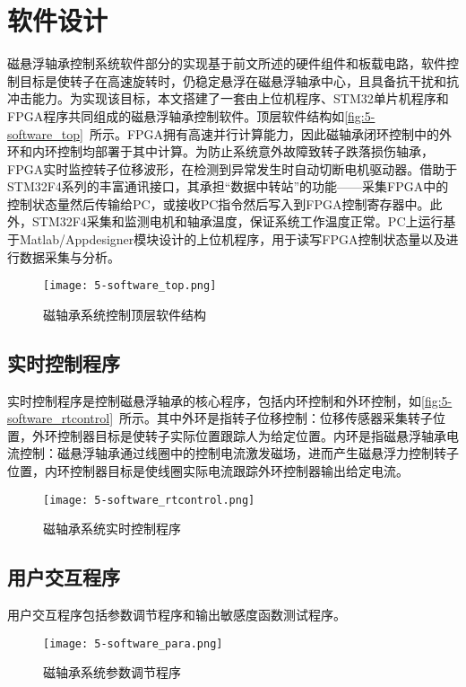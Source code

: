 \documentclass[
  lang=cn,
  degree=master,
  openany,oneside
]{nuaathesis}
\begin{document}
\section{软件设计}
磁悬浮轴承控制系统软件部分的实现基于前文所述的硬件组件和板载电路，软件控制目标是使转子在高速旋转时，仍稳定悬浮在磁悬浮轴承中心，且具备抗干扰和抗冲击能力。为实现该目标，本文搭建了一套由上位机程序、STM32单片机程序和FPGA程序共同组成的磁悬浮轴承控制软件。顶层软件结构如\autoref{fig:5-software_top}~所示。FPGA拥有高速并行计算能力，因此磁轴承闭环控制中的外环和内环控制均部署于其中计算。为防止系统意外故障致转子跌落损伤轴承，FPGA实时监控转子位移波形，在检测到异常发生时自动切断电机驱动器。借助于STM32F4系列的丰富通讯接口，其承担“数据中转站”的功能——采集FPGA中的控制状态量然后传输给PC，或接收PC指令然后写入到FPGA控制寄存器中。此外，STM32F4采集和监测电机和轴承温度，保证系统工作温度正常。PC上运行基于Matlab/Appdesigner模块设计的上位机程序，用于读写FPGA控制状态量以及进行数据采集与分析。

\begin{figure}[h!]
	\texttt{[image: 5-software\_top.png]}
	\caption{磁轴承系统控制顶层软件结构}
	\label{fig:5-software_top}
\end{figure}

\subsection{实时控制程序}
实时控制程序是控制磁悬浮轴承的核心程序，包括内环控制和外环控制，如\autoref{fig:5-software_rtcontrol}~所示。其中外环是指转子位移控制：位移传感器采集转子位置，外环控制器目标是使转子实际位置跟踪人为给定位置。内环是指磁悬浮轴承电流控制：磁悬浮轴承通过线圈中的控制电流激发磁场，进而产生磁悬浮力控制转子位置，内环控制器目标是使线圈实际电流跟踪外环控制器输出给定电流。

\begin{figure}[h!]
	\texttt{[image: 5-software\_rtcontrol.png]}
	\caption{磁轴承系统实时控制程序}
	\label{fig:5-software_rtcontrol}
\end{figure}

\subsection{用户交互程序}
用户交互程序包括参数调节程序和输出敏感度函数测试程序。

\begin{figure}[h!]
	\texttt{[image: 5-software\_para.png]}
	\caption{磁轴承系统参数调节程序}
	\label{fig:5-software_para}
\end{figure}
\end{document}
